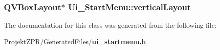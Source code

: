 \subsubsection[{vertical\-Layout}]{\setlength{\rightskip}{0pt plus 5cm}Q\-V\-Box\-Layout$\ast$ Ui\-\_\-\-Start\-Menu\-::vertical\-Layout}\label{class_ui___start_menu_a64f359e686ba29742dab589010fd0fb0}


The documentation for this class was generated from the following file\-:\begin{DoxyCompactItemize}
\item 
Projekt\-Z\-P\-R/\-Generated\-Files/{\bf ui\-\_\-startmenu.\-h}\end{DoxyCompactItemize}
